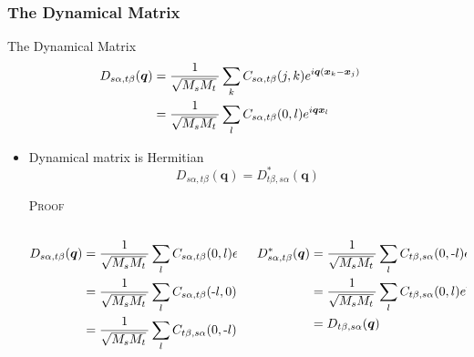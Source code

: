 \begin{frame}
  \frametitle{The Dynamical Matrix}
  The Dynamical Matrix
  \begin{align*}
    \mathcolor{black}{
      D_{s\alpha,t\beta}(\boldsymbol{q})
    }
    &=
    {1\over\sqrt{M_sM_t}\,}
    \sum_k
    C_{s\alpha,t\beta}(j, k)
    e^{i\boldsymbol{q}(\boldsymbol{x}_k - \boldsymbol{x}_j)} \cr
    &=
    {1\over\sqrt{M_sM_t}\,}
    \sum_l
    C_{s\alpha,t\beta}(0, l)
    e^{i\boldsymbol{q}\boldsymbol{x}_l}
  \end{align*}

  \begin{itemize}
  \item Dynamical matrix is Hermitian
    \begin{equation*}
      D_{s\alpha,t\beta}(\boldsymbol{q})
      =
      D^*_{t\beta,s\alpha}(\boldsymbol{q})
    \end{equation*}
    
    \begin{block}{\textsc{Proof}}
      \small
      \begin{columns}[t]
        \begin{column}{0.5\textwidth}
          \begin{align*}
            D_{s\alpha,t\beta}(\boldsymbol{q})
            &=
            {1\over\sqrt{M_sM_t}\,}
            \sum_l
            C_{s\alpha,t\beta}(0, l)
              e^{i\boldsymbol{q}\boldsymbol{x}_l} \cr
            &= 
            {1\over\sqrt{M_sM_t}\,}
            \sum_l
            C_{s\alpha,t\beta}(\text{-}l, 0)
              e^{i\boldsymbol{q}\boldsymbol{x}_l} \cr
            &= 
            {1\over\sqrt{M_sM_t}\,}
            \sum_l
            C_{t\beta,s\alpha}(0, \text{-}l)
              e^{i\boldsymbol{q}\boldsymbol{x}_l} \cr
          \end{align*}
        \end{column}
        \begin{column}{0.4\textwidth}
          \begin{align*}
            D^*_{s\alpha,t\beta}(\boldsymbol{q})
            &=
            {1\over\sqrt{M_sM_t}\,}
            \sum_l
            C_{t\beta,s\alpha}(0, \text{-}l)
              e^{\text{-}i\boldsymbol{q}\boldsymbol{x}_l} \cr
            &=
            {1\over\sqrt{M_sM_t}\,}
            \sum_l
            C_{t\beta,s\alpha}(0, l)
              e^{i\boldsymbol{q}\boldsymbol{x}_l} \cr
            &= 
            D_{t\beta,s\alpha}(\boldsymbol{q})
          \end{align*}
        \end{column}
        
      \end{columns}
    \end{block}
  \end{itemize}
\end{frame}